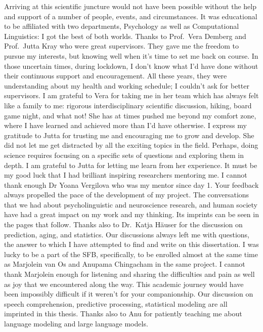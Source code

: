 \documentclass[a4paper, nobind]{templates/ociamthesis}
\begin{document}
\begin{romanpages}
\begin{preface}
 Arriving at this scientific juncture would not have been possible without the help and support of a number of people, events, and circumstances.
 It was educational to be affiliated with two departments, Psychology as well as Computational Linguistics:
 I got the best of both worlds.
 Thanks to Prof.~Vera Demberg and Prof.~Jutta Kray who were great supervisors.
 They gave me the freedom to pursue my interests,
 but knowing well when it's time to set me back on course.
 In those uncertain times, during lockdown, I don't know what I'd have done without their continuous support and encouragement.
 All these years, they were understanding about my health and working schedule;
 I couldn't ask for better supervisors.
 I am grateful to Vera for taking me in her team which has always felt like a family to me:
 rigorous interdisciplinary scientific discussion, hiking, board game night, and what not!
 She has at times pushed me beyond my comfort zone, where I have learned and achieved more than I'd have otherwise.
 I express my gratitude to Jutta for trusting me and encouraging me to grow and develop.
 She did not let me get distracted by all the exciting topics in the field.
 Perhaps, doing science requires focusing on a specific sets of questions and exploring them in depth.
 I am grateful to Jutta for letting me learn from her experience.
 It must be my good luck that I had brilliant inspiring researchers mentoring me.
 I cannot thank enough Dr Yoana Vergilova who was my mentor since day 1.
 Your feedback always propelled the pace of the development of my project.
 The conversations that we had about psycholinguistic and neuroscience research, and human society have had a great impact on my work and my thinking.
 Its imprints can be seen in the pages that follow.
 Thanks also to Dr.~Katja Häuser for the discussion on prediction, aging, and statistics.
 Our discussions always left me with questions, the answer to which I have attempted to find and write on this dissertation.
 I was lucky to be a part of the SFB,
 specifically, to be enrolled almost at the same time as Marjolein van Os and Anupama Chingacham in the same project.
 I cannot thank Marjolein enough for listening and sharing the difficulties and pain as well as joy that we encountered along the way.
 This academic journey would have been impossibly difficult if it weren't for your companionship.
 Our discussion on speech comprehension, predictive processing, statistical modeling are all imprinted in this thesis.
 Thanks also to Anu for patiently teaching me about language modeling and large language models.
\end{preface}




\end{romanpages}
\end{document}
